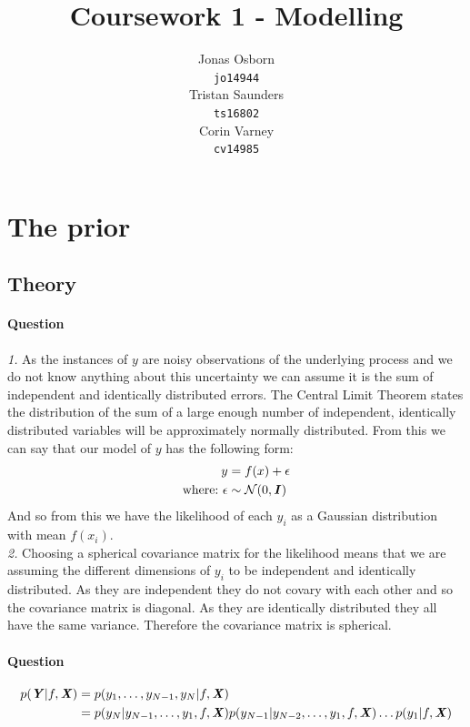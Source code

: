\documentclass{article}
\title{Coursework 1 - Modelling}
\author{
  Jonas Osborn \\
  \texttt{jo14944} \\
  \And
  Tristan Saunders \\
  \texttt{ts16802} \\
  \And
  Corin Varney \\
  \texttt{cv14985} \\
}
\newcounter{question}
\newcommand{\question}{\stepcounter{question}\paragraph{Question \thequestion}}
\newcommand{\mat}[1]{\textbf{\textit{#1}}}
\begin{document}
\maketitle

\section{The prior}
\subsection{Theory}
\question \emph{1.} As the instances of $y$ are noisy observations of the underlying process and we do not know anything about this uncertainty we can assume it is the sum of independent and identically distributed errors. The Central Limit Theorem states the distribution of the sum of a large enough number of independent, identically distributed variables will be approximately normally distributed. From this we can say that our model of $y$ has the following form:
\begin{align*}
	y & = f(x) + \epsilon \\
	\text{where:~}
	\epsilon & \sim \mathcal{N}(0, \mat{I})
\end{align*}
And so from this we have the likelihood of each $y_i$ as a Gaussian distribution with mean $f(x_i)$.\\

\emph{2.} Choosing a spherical covariance matrix for the likelihood means that we are assuming the different dimensions of $y_i$ to be independent and identically distributed. As they are independent they do not covary with each other and so the covariance matrix is diagonal. As they are identically distributed they all have the same variance. Therefore the covariance matrix is spherical.
\question
\begin{align*}
	p(\mat{Y}|f,\mat{X}) &= p(y_1,\ldots,y_{N-1},y_N|f,\mat{X}) \\
	&= p(y_N|y_{N-1},\ldots,y_1,f,\mat{X})p(y_{N-1}|y_{N-2},\ldots,y_1,f,\mat{X})\ldots p(y_1|f,\mat{X}) \\
\end{align*}
\end{document}
